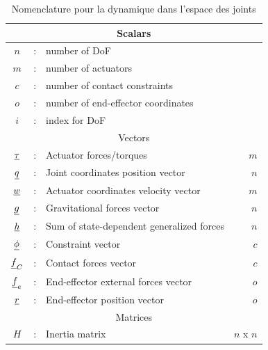{\begin{table}[htbp]
	\centering
	\caption{Nomenclature pour la dynamique dans l'espace des joints}	%
		\begin{tabular}{ c c l r }
        \hline \hline
				\multicolumn{4}{c}{Scalars} \\
				\hline \hline
			$n$             &  :  & number of DoF                                              & \\
			$m$             &  :  & number of actuators                                        & \\
			$c$             &  :  & number of contact constraints                              & \\
			$o$             &  :  & number of end-effector coordinates                         & \\ 
			$i$             &  :  & index for DoF                                              & \\ 
			\hline \hline
			\multicolumn{4}{c}{Vectors} \\
			\hline \hline
			$\underline{\tau}$    &  :  & Actuator forces/torques                                    & $m$  \\
			$\underline{q}$       &  :  & Joint coordinates position vector                          & $n$  \\
			$\underline{w}$       &  :  & Actuator coordinates velocity vector                          & $m$  \\ 
			$\underline{g}$       &  :  & Gravitational forces vector                                & $n$  \\
			$\underline{h}$       &  :  & Sum of state-dependent generalized forces                  & $n$  \\
			$\underline{\phi}$    &  :  & Constraint vector                                          & $c$  \\
			$\underline{f}_C$     &  :  & Contact forces vector                                      & $c$  \\
			$\underline{f}_e$     &  :  & End-effector external forces vector                        & $o$  \\
			$\underline{r}$       &  :  & End-effector position vector                               & $o$  \\
			\hline \hline
			\multicolumn{4}{c}{Matrices} \\
			\hline \hline
			$H$             &  :  & Inertia matrix                                             & $n$ x $n$ \\

\end{tabular}
\end{table}}

